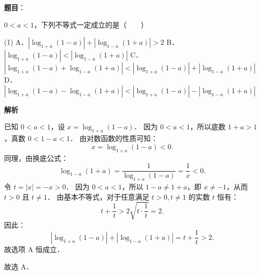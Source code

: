 \begin{answer}

\textbf{题目}：

$0 < a < 1$，下列不等式一定成立的是\mbox{（　　）}

\begin{gkopts}(1)
\task A．$|\log_{1+a} (1-a)| + |\log_{1-a} (1+a)| > 2$
\task B．$|\log_{1+a} (1-a)| < |\log_{1-a} (1+a)|$
\task C．$|\log_{1+a} (1-a) + \log_{1-a} (1+a)| < |\log_{1+a} (1-a)| + |\log_{1-a} (1+a)|$
\task D．$|\log_{1+a} (1-a) - \log_{1-a} (1+a)| < |\log_{1+a} (1-a)| - |\log_{1-a} (1+a)|$
\end{gkopts}

\textbf{解析}

已知 $0 < a < 1$，设 $x = \log_{1+a}(1-a)$．
因为 $0 < a < 1$，所以底数 $1+a > 1$，真数 $0 < 1-a < 1$．
由对数函数的性质可知：
\nopagebreak[4]
\[
x = \log_{1+a}(1-a) < 0.
\]
同理，由换底公式：
\nopagebreak[4]
\[
\log_{1-a}(1+a) = \dfrac{1}{\log_{1+a}(1-a)} = \dfrac{1}{x} < 0.
\]
令 $t = |x| = -x > 0$．
因为 $0 < a < 1$，所以 $1-a \neq 1+a$，即 $x \neq -1$，从而 $t > 0$ 且 $t \neq 1$．
由基本不等式，对于任意满足 $t > 0, t \neq 1$ 的实数 $t$ 恒有：
\nopagebreak[4]
\[
t + \dfrac{1}{t} > 2\sqrt{t \cdot \dfrac{1}{t}} = 2.
\]
因此：
\nopagebreak[4]
\[
|\log_{1+a}(1-a)| + |\log_{1-a}(1+a)| = t + \dfrac{1}{t} > 2.
\]
故选项 A 恒成立．

故选 A．


\end{answer}
